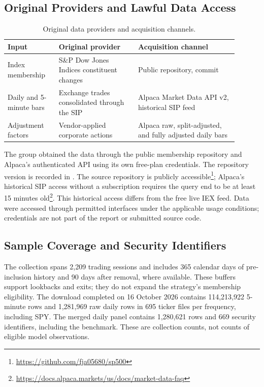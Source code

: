 \documentclass[11pt,a4paper]{article}
\newcommand{\code}[1]{\texttt{\detokenize{#1}}}
\begin{document}
\subsection{Original Providers and Lawful Data Access}
\label{sec:data-providers}
\begin{table}[htbp]\centering\small
\caption{Original data providers and acquisition channels.}
\label{tab:data-sources}
\begin{tabular}{p{0.20\linewidth}p{0.31\linewidth}p{0.39\linewidth}}
\toprule Input & Original provider & Acquisition channel\\\midrule
Index membership & S\&P Dow Jones Indices constituent changes &
Public \code{fja05680/sp500} repository, commit \code{a2430f2}\\
Daily and 5-minute bars & Exchange trades consolidated through the SIP &
Alpaca Market Data API v2, historical SIP feed\\
Adjustment factors & Vendor-applied corporate actions &
Alpaca raw, split-adjusted, and fully adjusted daily bars\\\bottomrule
\end{tabular}
\end{table}
The group obtained the data through the public membership repository and
Alpaca's authenticated API using its own free-plan credentials. The repository
version is recorded in \code{sp500/universe/source.json}.
The source repository is publicly accessible\footnote{\url{https://github.com/fja05680/sp500}};
Alpaca's historical SIP access without a subscription requires the query end
to be at least 15 minutes old\footnote{\url{https://docs.alpaca.markets/us/docs/market-data-faq}}.
This historical access differs from the free live IEX feed. Data were accessed
through permitted interfaces under the applicable usage conditions; credentials
are not part of the report or submitted source code.

\subsection{Sample Coverage and Security Identifiers}
\label{sec:data-coverage}
The collection spans 2,209 trading sessions and includes 365 calendar days
of pre-inclusion history and 90 days after removal, where available. These
buffers support lookbacks and exits; they do not expand the strategy's
membership eligibility. The download completed on 16 October 2026 contains
114,213,922 5-minute rows and 1,281,969 raw daily rows in 695 ticker files
per frequency, including SPY. The merged daily panel contains 1,280,621 rows
and 669 security identifiers, including the benchmark. These are collection
counts, not counts of eligible model observations.
\end{document}
